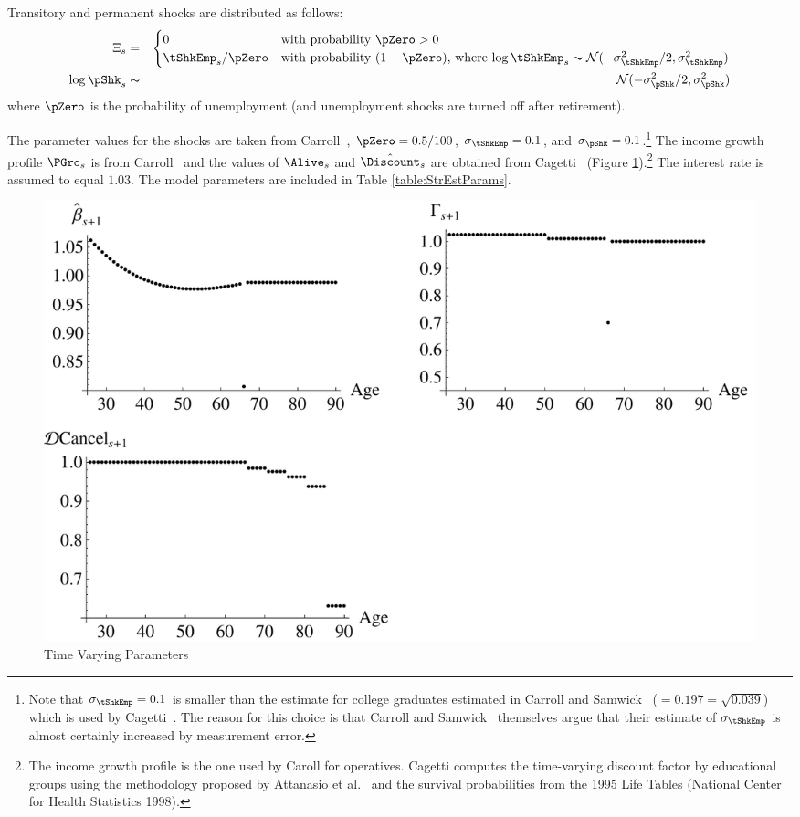 \documentclass[titlepage]{\econtex}
\begin{document}
Transitory and permanent shocks are distributed as follows:
\begin{eqnarray}
\Xi_{s}&=&
\begin{cases}
 0\phantom{/\pZero} & \text{with probability $\pZero>0$} \\
 \tShkEmp_{s}/\pZero      & \text{with probability $(1-\pZero)$, where $\log \tShkEmp_{s}\thicksim \mathcal{N}(-\sigma_{\tShkEmp}^{2}/2,\sigma_{\tShkEmp}^{2})$}\\
\end{cases}\\
  \log \pShk_{s} &\thicksim& \mathcal{N}(-\sigma_{\pShk}^{2}/2,\sigma_{\pShk}^{2})
\end{eqnarray}
where $\pZero$ is the probability of unemployment (and unemployment shocks are turned off after retirement).

The parameter values for the shocks are taken from Carroll~\citeyearpar{carroll:brookings}, $\pZero=0.5/100$, $\sigma _{\tShkEmp }=0.1$, and $\sigma_{\pShk}=0.1$.\footnote{Note that $\sigma _{\tShkEmp}=0.1$ is smaller than the estimate for college graduates estimated in
Carroll and Samwick~\citeyearpar{carroll&samwick:nature} ($=0.197=\sqrt{0.039}$) which is used by Cagetti~\citeyearpar{cagettiWprofiles}. The reason for this choice is that Carroll and Samwick~\citeyearpar{carroll&samwick:nature} themselves argue that their estimate of $\sigma_{\tShkEmp }$ is almost certainly increased by measurement error.} The income growth profile $\PGro_{s}$ is from Carroll~\citeyearpar{carrollBSLCPIH} and the values of $\Alive_{s}$ and $\hat{\Discount}_{s}$ are obtained from Cagetti~\citeyearpar{cagettiWprofiles} (Figure \ref{fig:TimeVaryingParam}).\footnote{The income growth profile is the one used by Caroll for operatives. Cagetti computes the time-varying discount factor by educational groups using the methodology proposed by Attanasio et al.~\citeyearpar{AttanasioBanksMeghirWeber} and the survival probabilities from the 1995 Life Tables (National Center for Health Statistics 1998).} The interest rate is assumed to equal $1.03$. The model parameters are included in Table \ref{table:StrEstParams}.

\hypertarget{PlotTimeVaryingParam}{}
\begin{figure}[h]
    \includegraphics{./Figures/PlotTimeVaryingParam}
    \caption{Time Varying Parameters}
    \label{fig:TimeVaryingParam}
\end{figure}
\end{document}
